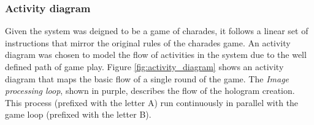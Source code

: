 \subsubsection{Activity diagram}
\begin{figure}[h!]
\end{figure}
Given the system was deigned to be a game of charades, it follows a linear set of instructions that mirror the original rules of the charades game. An activity diagram was chosen to model the flow of activities in the system due to the well defined path of game play. Figure \ref{fig:activity_diagram} shows an activity diagram that maps the basic flow of a single round of the game. The \textit{Image processing loop}, shown in purple, describes the flow  of the hologram creation. This process (prefixed with the letter A) run continuously in parallel with the game loop (prefixed with the letter B).


